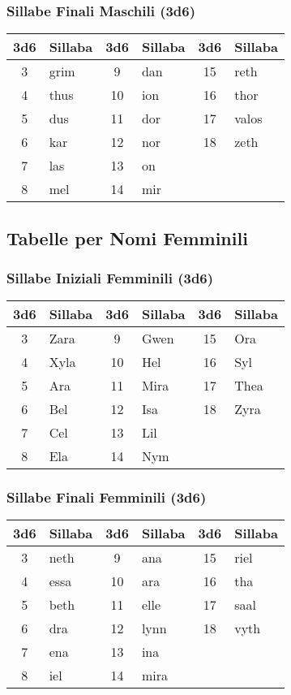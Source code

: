 \begin{multicols}{2}
{\subsubsection*{Sillabe Finali Maschili (3d6)}

\noindent\begin{tabular}{|c|l||c|l||c|l|}
\toprule
\textbf{3d6} & \textbf{Sillaba} & \textbf{3d6} & \textbf{Sillaba} & \textbf{3d6} & \textbf{Sillaba} \\
\midrule
3 & grim & 9 & dan & 15 & reth \\
4 & thus & 10 & ion & 16 & thor \\
5 & dus & 11 & dor & 17 & valos \\
6 & kar & 12 & nor & 18 & zeth \\
7 & las & 13 & on & & \\
8 & mel & 14 & mir & & \\
\bottomrule
\end{tabular}


\subsection*{Tabelle per Nomi Femminili}

\subsubsection*{Sillabe Iniziali Femminili (3d6)}

\noindent\begin{tabular}{|c|l||c|l||c|l|}
\toprule
\textbf{3d6} & \textbf{Sillaba} & \textbf{3d6} & \textbf{Sillaba} & \textbf{3d6} & \textbf{Sillaba} \\
\midrule
3 & Zara & 9 & Gwen & 15 & Ora \\
4 & Xyla & 10 & Hel & 16 & Syl \\
5 & Ara & 11 & Mira & 17 & Thea \\
6 & Bel & 12 & Isa & 18 & Zyra \\
7 & Cel & 13 & Lil & & \\
8 & Ela & 14 & Nym & & \\
\bottomrule
\end{tabular}

\subsubsection*{Sillabe Finali Femminili (3d6)}
\noindent\begin{tabular}{|c|l||c|l||c|l|}
\toprule
\textbf{3d6} & \textbf{Sillaba} & \textbf{3d6} & \textbf{Sillaba} & \textbf{3d6} & \textbf{Sillaba} \\
\midrule
3 & neth & 9 & ana & 15 & riel \\
4 & essa & 10 & ara & 16 & tha \\
5 & beth & 11 & elle & 17 & saal \\
6 & dra & 12 & lynn & 18 & vyth \\
7 & ena & 13 & ina & & \\
8 & iel & 14 & mira & & \\
\bottomrule
\end{tabular}


}
\end{multicols}
